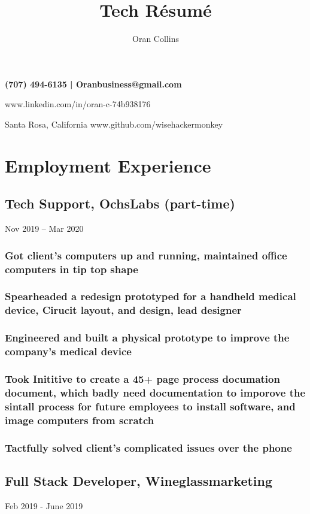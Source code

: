 \documentclass{article}
\makeatletter
\renewcommand{\maketitle}{
\begin{flushleft}
\bfseries
{\Huge\theauthor}\hfill
(707) 494-6135 |  Oranbusiness@gmail.com

\hfill www.linkedin.com/in/oran-c-74b938176

{\hspace{1mm}Santa Rosa, California}\hfill 
www.github.com/wisehackermonkey

\end{flushleft}
}
\makeatother
\begin{document}
\title{Tech R\'esum\'e}
\author{Oran Collins}


\maketitle

\section{Employment Experience}
	 \subsection{Tech Support, OchsLabs (part-time)} Nov 2019 – Mar 2020
        
        \vspace{-2mm}
    	\subsubsection{Got client's computers up and running, maintained office computers in tip top shape}
        \subsubsection{Spearheaded a redesign prototyped for a handheld medical device, Cirucit layout, and design, lead designer }
    	\subsubsection{Engineered and built a physical prototype to improve the company's medical device}
    	\subsubsection{Took Inititive to create a 45+ page process documation document, which badly need documentation to imporove the sintall process for future employees to install software, and image computers from scratch }

    	\subsubsection{Tactfully solved client's complicated issues over the phone}
    	

    \subsection{Full Stack Developer, Wineglassmarketing}Feb 2019 - June 2019
	        \vspace{-2mm}
\end{document}
